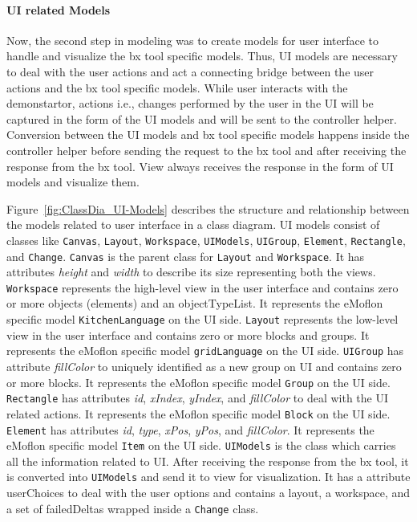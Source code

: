 \paragraph{UI related Models}
Now, the second step in modeling was to create models for user interface to handle and visualize the bx tool specific models. Thus, UI models are necessary to deal with the user actions and act a connecting bridge between the user actions and the bx tool specific models. While user interacts with the demonstartor, actions i.e., changes performed by the user in the UI will be captured in the form of the UI models and will be sent to the controller helper. Conversion between the UI models and bx tool specific models happens inside the controller helper before sending the request to the bx tool 
and after receiving the response from the bx tool. View always receives the response in the form of UI models and visualize them.

Figure~\ref{fig:ClassDia_UI-Models} describes the structure and relationship between the models related to user interface in a class diagram. UI models consist of classes like \texttt{Canvas}, \texttt{Layout}, \texttt{Workspace}, \texttt{UIModels}, \texttt{UIGroup}, \texttt{Element}, \texttt{Rectangle}, and \texttt{Change}. \texttt{Canvas} is the parent class for \texttt{Layout} and \texttt{Workspace}. It has attributes \textit{height} and \textit{width} to describe its size representing both the views. \texttt{Workspace} represents the high-level view in the user interface and contains zero or more objects (elements) and an objectTypeList. It represents the eMoflon specific model \texttt{KitchenLanguage} on the UI side. \texttt{Layout} represents the low-level view in the user interface and contains zero or more blocks and groups. It represents the eMoflon specific model \texttt{gridLanguage} on the UI side.  \texttt{UIGroup} has attribute \textit{fillColor} to uniquely identified as a new group on UI and contains zero or more blocks. It represents the eMoflon specific model \texttt{Group} on the UI side. \texttt{Rectangle} has attributes \textit{id}, \textit{xIndex}, \textit{yIndex}, and \textit{fillColor} to deal with the UI related actions. It represents the eMoflon specific model \texttt{Block} on the UI side. \texttt{Element} has attributes \textit{id}, \textit{type}, \textit{xPos}, \textit{yPos}, and \textit{fillColor}. It represents the eMoflon specific model \texttt{Item} on the UI side. \texttt{UIModels} is the class which carries all the information related to UI. After receiving the response from the bx tool, it is converted into \texttt{UIModels} and send it to view for visualization. It has a attribute userChoices to deal with the user options and contains a layout, a workspace, and a set of failedDeltas wrapped inside a \texttt{Change} class.

